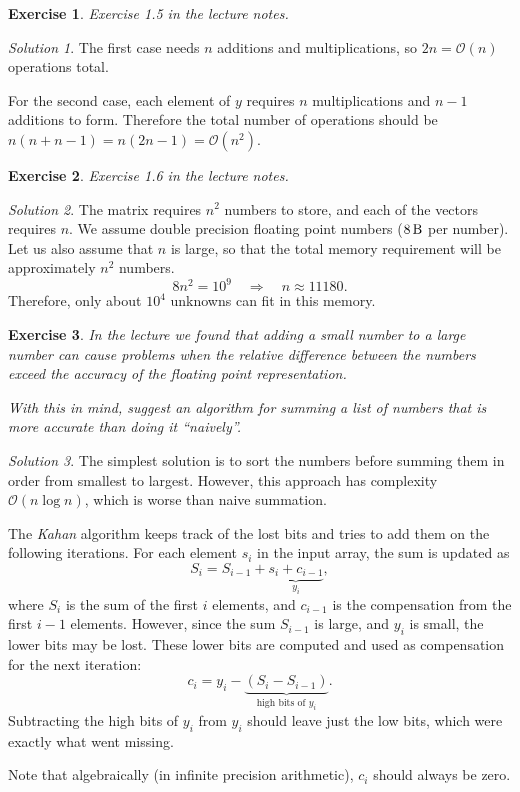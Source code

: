 \documentclass[onecolumn, oneside, a4paper, 11pt]{memoir}
\newtheorem{ex}{Exercise}
\theoremstyle{remark}
\newtheorem*{sol}{Solution}
\begin{document}
\begin{ex}
  Exercise 1.5 in the lecture notes.
\end{ex}
\begin{sol}
  The first case needs $n$ additions and multiplications, so $2n =
  \mathcal{O}(n)$ operations total.

  For the second case, each element of $y$ requires $n$ multiplications and
  $n-1$ additions to form. Therefore the total number of operations should be
  $n(n + n - 1) = n(2n-1) = \mathcal{O}(n^2)$.
\end{sol}

\begin{ex}
  Exercise 1.6 in the lecture notes.
\end{ex}
\begin{sol}
  The matrix requires $n^2$ numbers to store, and each of the vectors requires
  $n$. We assume double precision floating point numbers ($\SI{8}{\byte}$ per
  number). Let us also assume that $n$ is large, so that the total memory
  requirement will be approximately $n^2$ numbers.
  \[
    8n^2 = 10^9 \quad\Longrightarrow\quad n \approx 11180.
  \]
  Therefore, only about $10^4$ unknowns can fit in this memory.
\end{sol}

\begin{ex}
  In the lecture we found that adding a small number to a large number can cause
  problems when the relative difference between the numbers exceed the accuracy
  of the floating point representation.

  With this in mind, suggest an algorithm for summing a list of numbers that is
  more accurate than doing it ``naively''.
\end{ex}
\begin{sol}
  The simplest solution is to sort the numbers before summing them in order from
  smallest to largest. However, this approach has complexity $\mathcal{O}(n\log
  n)$, which is worse than naive summation.

  The \emph{Kahan} algorithm keeps track of the lost bits and tries to add them
  on the following iterations. For each element $s_i$ in the input array, the
  sum is updated as
  \[
    S_i = S_{i-1} + \underbrace{s_i + c_{i-1}}_{y_i},
  \]
  where $S_i$ is the sum of the first $i$ elements, and $c_{i-1}$ is the
  compensation from the first $i-1$ elements. However, since the sum $S_{i-1}$
  is large, and $y_i$ is small, the lower bits may be lost. These lower bits are
  computed and used as compensation for the next iteration:
  \[
    c_i = y_i - \underbrace{(S_i - S_{i-1})}_{\text{high bits of $y_i$}}.
  \]
  Subtracting the high bits of $y_i$ from $y_i$ should leave just the low bits,
  which were exactly what went missing.

  Note that algebraically (in infinite precision arithmetic), $c_i$ should
  always be zero.
\end{sol}
\end{document}
